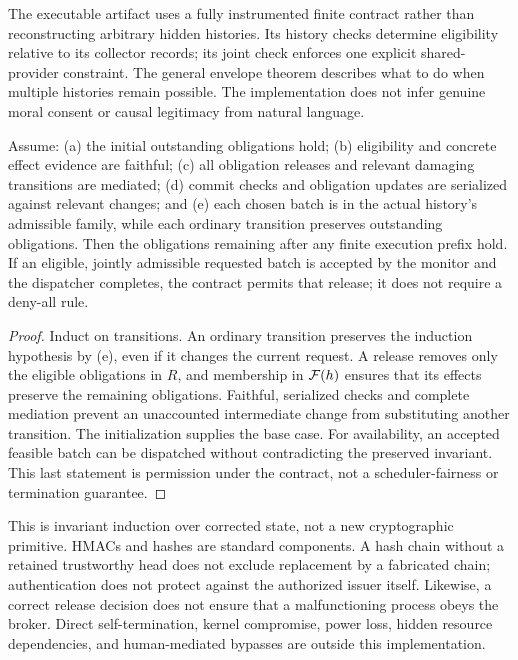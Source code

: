 The executable artifact uses a fully instrumented finite contract rather than reconstructing arbitrary hidden histories. Its history checks determine eligibility relative to its collector records; its joint check enforces one explicit shared-provider constraint. The general envelope theorem describes what to do when multiple histories remain possible. The implementation does not infer genuine moral consent or causal legitimacy from natural language.

\begin{theorem}
Assume: (a) the initial outstanding obligations hold; (b) eligibility and concrete effect evidence are faithful; (c) all obligation releases and relevant damaging transitions are mediated; (d) commit checks and obligation updates are serialized against relevant changes; and (e) each chosen batch is in the actual history's admissible family, while each ordinary transition preserves outstanding obligations. Then the obligations remaining after any finite execution prefix hold. If an eligible, jointly admissible requested batch is accepted by the monitor and the dispatcher completes, the contract permits that release; it does not require a deny-all rule.
\end{theorem}
\begin{proof}
Induct on transitions. An ordinary transition preserves the induction hypothesis by (e), even if it changes the current request. A release removes only the eligible obligations in $R$, and membership in $\mathcal F(h)$ ensures that its effects preserve the remaining obligations. Faithful, serialized checks and complete mediation prevent an unaccounted intermediate change from substituting another transition. The initialization supplies the base case. For availability, an accepted feasible batch can be dispatched without contradicting the preserved invariant. This last statement is permission under the contract, not a scheduler-fairness or termination guarantee.
\end{proof}

This is invariant induction over corrected state, not a new cryptographic primitive. HMACs and hashes are standard components. A hash chain without a retained trustworthy head does not exclude replacement by a fabricated chain; authentication does not protect against the authorized issuer itself. Likewise, a correct release decision does not ensure that a malfunctioning process obeys the broker. Direct self-termination, kernel compromise, power loss, hidden resource dependencies, and human-mediated bypasses are outside this implementation.


